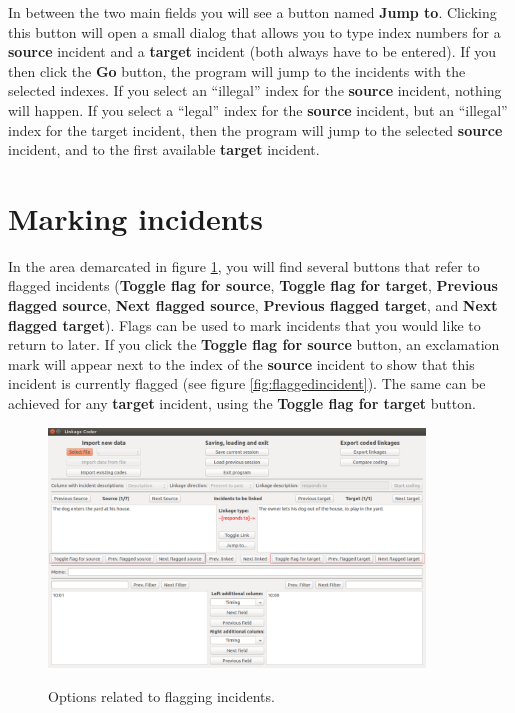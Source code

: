 \documentclass{memoir}
\begin{document}
In between the two main fields you will see a button named \textbf{Jump to}. Clicking this button will open a small dialog that allows you to type index numbers for a \textbf{source} incident and a \textbf{target} incident (both always have to be entered). If you then click the \textbf{Go} button, the program will jump to the incidents with the selected indexes. If you select an ``illegal'' index for the \textbf{source} incident, nothing will happen. If you select a ``legal'' index for the \textbf{source} incident, but an ``illegal'' index for the target incident, then the program will jump to the selected \textbf{source} incident, and to the first available \textbf{target} incident.

\section{Marking incidents}
\label{sec:markingincidents}

In the area demarcated in figure \ref{fig:flagoptions}, you will find several buttons that refer to flagged incidents (\textbf{Toggle flag for source}, \textbf{Toggle flag for target}, \textbf{Previous flagged source}, \textbf{Next flagged source}, \textbf{Previous flagged target}, and \textbf{Next flagged target}). Flags can be used to mark incidents that you would like to return to later. If you click the \textbf{Toggle flag for source} button, an exclamation mark will appear next to the index of the \textbf{source} incident to show that this incident is currently flagged (see figure \ref{fig:flaggedincident}). The same can be achieved for any \textbf{target} incident, using the \textbf{Toggle flag for target} button.

\begin{figure}[h!]
  \centering
  \caption{Options related to flagging incidents.}
  \includegraphics[width=100mm]{Screenshot_15.pdf}
  \label{fig:flagoptions}
\end{figure}
\end{document}
